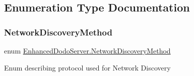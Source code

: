 \subsection{Enumeration Type Documentation}
\mbox{\label{namespace_enhanced_dodo_server_ab7ed9134420741255e959334cdc5207a}} 
\subsubsection{\texorpdfstring{NetworkDiscoveryMethod}{NetworkDiscoveryMethod}}
{\footnotesize\ttfamily enum \mbox{\hyperlink{namespace_enhanced_dodo_server_ab7ed9134420741255e959334cdc5207a}{Enhanced\+Dodo\+Server.\+Network\+Discovery\+Method}}\hspace{0.3cm}{\ttfamily [strong]}}



Enum describing protocol used for Network Discovery 


